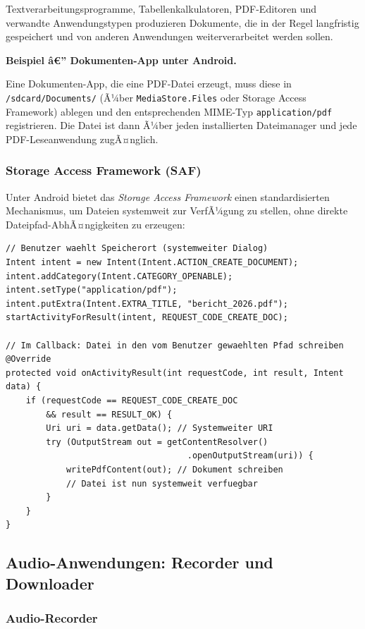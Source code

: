 ﻿\documentclass[12pt, a4paper]{article}
\begin{document}
Textverarbeitungsprogramme, Tabellenkalkulatoren, PDF-Editoren und verwandte
Anwendungstypen produzieren Dokumente, die in der Regel langfristig gespeichert und
von anderen Anwendungen weiterverarbeitet werden sollen.

\noindent\textbf{Beispiel â€” Dokumenten-App unter Android.}\par
Eine Dokumenten-App, die eine PDF-Datei erzeugt, muss diese in
\texttt{/sdcard/Documents/} (Ã¼ber \texttt{MediaStore.Files} oder Storage Access Framework)
ablegen und den entsprechenden MIME-Typ \texttt{application/pdf} registrieren.
Die Datei ist dann Ã¼ber jeden installierten Dateimanager und jede PDF-Leseanwendung
zugÃ¤nglich.

\subsubsection{Storage Access Framework (SAF)}

Unter Android bietet das \emph{Storage Access Framework} einen standardisierten
Mechanismus, um Dateien systemweit zur VerfÃ¼gung zu stellen, ohne direkte
Dateipfad-AbhÃ¤ngigkeiten zu erzeugen:

\begin{lstlisting}[style=android, caption={Dokument ueber SAF systemweit bereitstellen}]
// Benutzer waehlt Speicherort (systemweiter Dialog)
Intent intent = new Intent(Intent.ACTION_CREATE_DOCUMENT);
intent.addCategory(Intent.CATEGORY_OPENABLE);
intent.setType("application/pdf");
intent.putExtra(Intent.EXTRA_TITLE, "bericht_2026.pdf");
startActivityForResult(intent, REQUEST_CODE_CREATE_DOC);

// Im Callback: Datei in den vom Benutzer gewaehlten Pfad schreiben
@Override
protected void onActivityResult(int requestCode, int result, Intent data) {
    if (requestCode == REQUEST_CODE_CREATE_DOC
        && result == RESULT_OK) {
        Uri uri = data.getData(); // Systemweiter URI
        try (OutputStream out = getContentResolver()
                                    .openOutputStream(uri)) {
            writePdfContent(out); // Dokument schreiben
            // Datei ist nun systemweit verfuegbar
        }
    }
}
\end{lstlisting}

\subsection{Audio-Anwendungen: Recorder und Downloader}

\subsubsection{Audio-Recorder}
\end{document}

